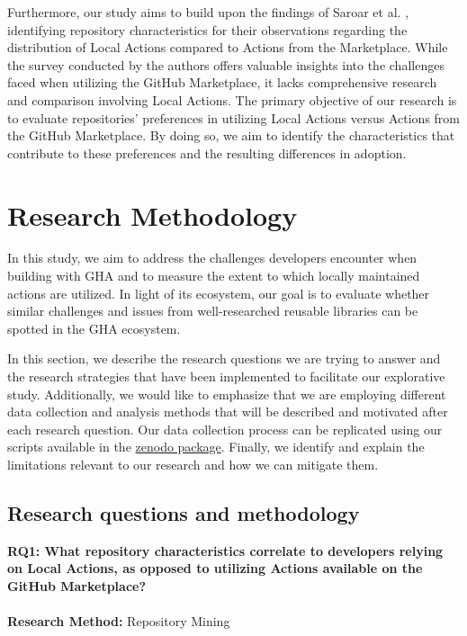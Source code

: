\documentclass[conference]{IEEEtran}
\begin{document}
	Furthermore, our study aims to build upon the findings of Saroar et al. \cite{saroar2023developers}, identifying repository characteristics for their observations regarding the distribution of Local Actions compared to Actions from the Marketplace. While the survey conducted by the authors offers valuable insights into the challenges faced when utilizing the GitHub Marketplace, it lacks comprehensive research and comparison involving Local Actions. The primary objective of our research is to evaluate repositories' preferences in utilizing Local Actions versus Actions from the GitHub Marketplace. By doing so, we aim to identify the characteristics that contribute to these preferences and the resulting differences in adoption.




\section{Research Methodology}
    In this study, we aim to address the challenges developers encounter when building with GHA and to measure the extent to which locally maintained actions are utilized. In light of its ecosystem, our goal is to evaluate whether similar challenges and issues from well-researched reusable libraries can be spotted in the GHA ecosystem.

In this section, we describe the research questions we are trying to answer and the research strategies that have been implemented to facilitate our explorative study. Additionally, we would like to emphasize that we are employing different data collection and analysis methods that will be described and motivated after each research question. Our data collection process can be replicated using our scripts available in the \href{https://doi.org/10.5281/zenodo.11268782} {zenodo package}\cite{Marof2024}. Finally, we identify and explain the limitations relevant to our research and how we can mitigate them. 

    \subsection{Research questions and methodology}
        \textbf{RQ1: What repository characteristics correlate to developers relying on Local Actions, as opposed to utilizing Actions available on the GitHub Marketplace?}\\\\
 \textbf{Research Method:}  Repository Mining 
\end{document}

